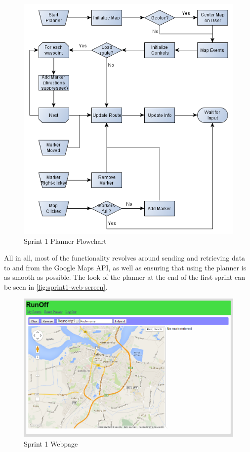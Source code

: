 \begin{figure}[ht]
 \centering
 \includegraphics[width=\textwidth]{img/sprint1webflow.png}
 \caption{Sprint 1 Planner Flowchart}
 \label{fig:sprint1-web-flow}
\end{figure}

All in all, most of the functionality revolves around sending and retrieving data to and from the Google Maps \ac{API}, as well as ensuring that using the planner is as smooth as possible. The look of the planner at the end of the first sprint can be seen in \autoref{fig:sprint1-web-screen}.

\begin{figure}[ht]
 \centering
 \includegraphics[width=\textwidth]{img/webplanner1.png}
 \caption{Sprint 1 Webpage}
 \label{fig:sprint1-web-screen}
\end{figure}


